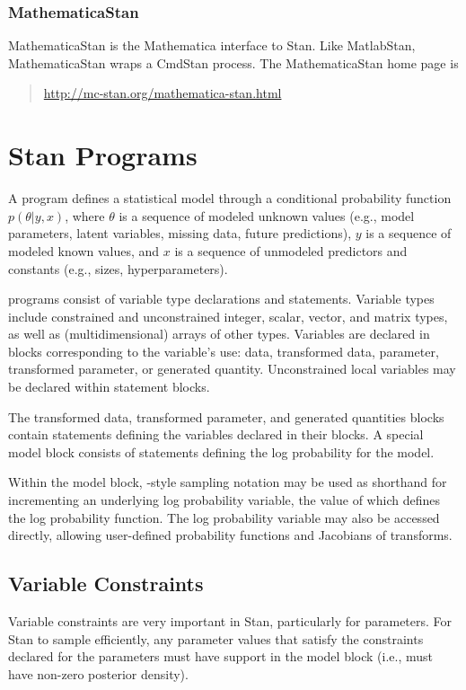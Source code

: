 \subsubsection{MathematicaStan}

MathematicaStan is the Mathematica interface to Stan.  Like
MatlabStan, MathematicaStan wraps a CmdStan process.  The
MathematicaStan home page is
%
\begin{quote}
\url{http://mc-stan.org/mathematica-stan.html}
\end{quote}


\section{Stan Programs}

A \Stan program defines a statistical model through a conditional
probability function $p(\theta|y,x)$, where $\theta$ is a sequence of
modeled unknown values (e.g., model parameters, latent variables, missing
data, future predictions), $y$ is a sequence of modeled known
values, and $x$ is a sequence of unmodeled predictors and constants
(e.g., sizes, hyperparameters).

\Stan programs consist of variable type declarations and statements.
Variable types include constrained and unconstrained integer, scalar,
vector, and matrix types, as well as (multidimensional) arrays of
other types.  Variables are declared in blocks corresponding to the
variable's use: data, transformed data, parameter, transformed
parameter, or generated quantity.  Unconstrained local variables may
be declared within statement blocks.  

The transformed data, transformed parameter, and generated quantities
blocks contain statements defining the variables declared in their
blocks.  A special model block consists of statements defining the log
probability for the model.

Within the model block, \BUGS-style sampling notation may be used as
shorthand for incrementing an underlying log probability variable, the
value of which defines the log probability function.  The log
probability variable may also be accessed directly, allowing
user-defined probability functions and Jacobians of transforms.

\subsection{Variable Constraints}

Variable constraints are very important in Stan, particularly for
parameters.  For Stan to sample efficiently, any parameter values that
satisfy the constraints declared for the parameters must have support
in the model block (i.e., must have non-zero posterior density).

